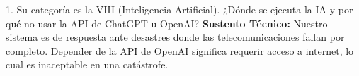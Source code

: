 \documentclass[10pt,letterpaper]{article}
\begin{document}
\begin{killerbox}{1. Su categoría es la VIII (Inteligencia Artificial). ¿Dónde se ejecuta la IA y por qué no usar la API de ChatGPT u OpenAI?}
\small\textbf{Sustento Técnico:} Nuestro sistema es de respuesta ante desastres donde las telecomunicaciones fallan por completo. Depender de la API de OpenAI significa requerir acceso a internet, lo cual es inaceptable en una catástrofe.
\end{killerbox}
\end{document}
